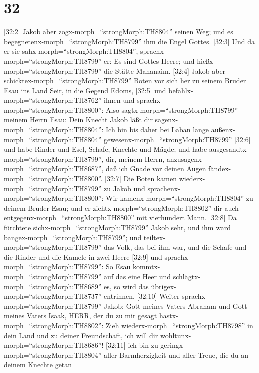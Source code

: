 \hypertarget{section-31}{%
\section{32}\label{section-31}}

 {[}32:2{]} Jakob aber zogx-morph=``strongMorph:TH8804''
seinen Weg; und es begegnetenx-morph=``strongMorph:TH8799'' ihm die
Engel Gottes.  {[}32:3{]} Und da er sie
sahx-morph=``strongMorph:TH8804'', sprachx-morph=``strongMorph:TH8799''
er: Es sind Gottes Heere; und hießx-morph=``strongMorph:TH8799'' die
Stätte Mahanaim.  {[}32:4{]} Jakob aber
schicktex-morph=``strongMorph:TH8799'' Boten vor sich her zu seinem
Bruder Esau ins Land Seir, in die Gegend Edoms,  {[}32:5{]}
und befahlx-morph=``strongMorph:TH8762'' ihnen und
sprachx-morph=``strongMorph:TH8800'': Also
sagtx-morph=``strongMorph:TH8799'' meinem Herrn Esau: Dein Knecht Jakob
läßt dir sagenx-morph=``strongMorph:TH8804'': Ich bin bis daher bei
Laban lange außenx-morph=``strongMorph:TH8804''
gewesenx-morph=``strongMorph:TH8799''  {[}32:6{]} und habe
Rinder und Esel, Schafe, Knechte und Mägde; und habe
ausgesandtx-morph=``strongMorph:TH8799'', dir, meinem Herrn,
anzusagenx-morph=``strongMorph:TH8687'', daß ich Gnade vor deinen Augen
fändex-morph=``strongMorph:TH8800''.  {[}32:7{]} Die Boten
kamen wiederx-morph=``strongMorph:TH8799'' zu Jakob und
sprachenx-morph=``strongMorph:TH8800'': Wir
kamenx-morph=``strongMorph:TH8804'' zu deinem Bruder Esau; und er
ziehtx-morph=``strongMorph:TH8802'' dir auch
entgegenx-morph=``strongMorph:TH8800'' mit vierhundert Mann.
 {[}32:8{]} Da fürchtete sichx-morph=``strongMorph:TH8799''
Jakob sehr, und ihm ward bangex-morph=``strongMorph:TH8799''; und
teiltex-morph=``strongMorph:TH8799'' das Volk, das bei ihm war, und die
Schafe und die Rinder und die Kamele in zwei Heere 
{[}32:9{]} und sprachx-morph=``strongMorph:TH8799'': So Esau
kommtx-morph=``strongMorph:TH8799'' auf das eine Heer und
schlägtx-morph=``strongMorph:TH8689'' es, so wird das
übrigex-morph=``strongMorph:TH8737'' entrinnen.  {[}32:10{]}
Weiter sprachx-morph=``strongMorph:TH8799'' Jakob: Gott meines Vaters
Abraham und Gott meines Vaters Isaak, HERR, der du zu mir gesagt
hastx-morph=``strongMorph:TH8802'': Zieh
wiederx-morph=``strongMorph:TH8798'' in dein Land und zu deiner
Freundschaft, ich will dir wohltunx-morph=``strongMorph:TH8686''!
 {[}32:11{]} ich bin zu
geringx-morph=``strongMorph:TH8804'' aller Barmherzigkeit und aller
Treue, die du an deinem Knechte getan
